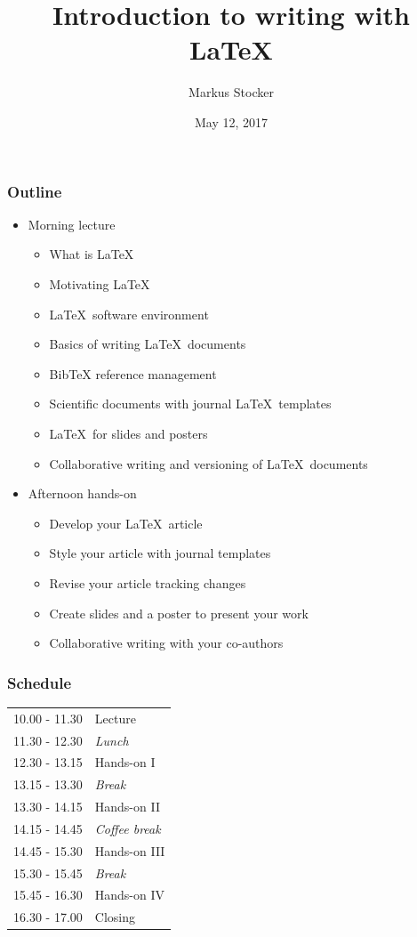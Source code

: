 \documentclass{beamer}
\title{Introduction to writing with LaTeX}
\author{Markus Stocker}
\date{May 12, 2017}
\begin{document}
\maketitle

\begin{frame}
  \frametitle{Outline}
  
  \begin{itemize}
  \item Morning lecture
  \begin{itemize}
  \item What is \LaTeX
  \item Motivating \LaTeX 
  \item \LaTeX~software environment
  \item Basics of writing \LaTeX~documents
  \item BibTeX reference management
  \item Scientific documents with journal \LaTeX~templates
  \item \LaTeX~for slides and posters
  \item Collaborative writing and versioning of \LaTeX~documents
  \end{itemize}
  \item Afternoon hands-on
  \begin{itemize}
  \item Develop your \LaTeX~article
  \item Style your article with journal templates
  \item Revise your article tracking changes
  \item Create slides and a poster to present your work
  \item Collaborative writing with your co-authors
  \end{itemize}
  \end{itemize}
\end{frame}

\begin{frame}
  \frametitle{Schedule}
  
  \begin{center}
  \begin{tabular}{ll}
  10.00 - 11.30 & Lecture \\
  11.30 - 12.30 & \emph{Lunch} \\
  12.30 - 13.15 & Hands-on I \\
  13.15 - 13.30 & \emph{Break} \\
  13.30 - 14.15 & Hands-on II \\
  14.15 - 14.45 & \emph{Coffee break} \\
  14.45 - 15.30 & Hands-on III \\
  15.30 - 15.45 & \emph{Break} \\
  15.45 - 16.30 & Hands-on IV \\
  16.30 - 17.00 & Closing
  \end{tabular}
  \end{center}
\end{frame}
\end{document}

